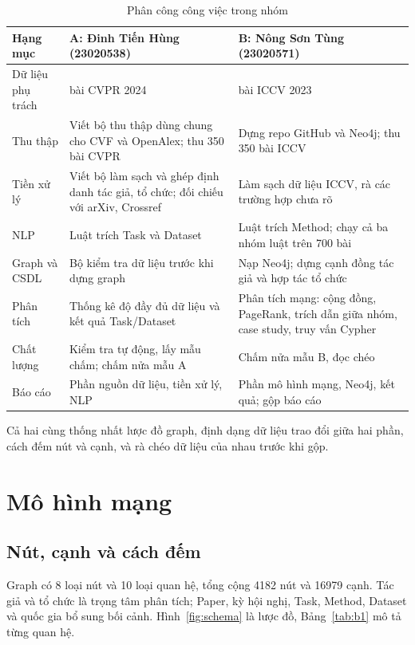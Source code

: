\documentclass[11pt,a4paper]{article}
\begin{document}
\begin{table}[H]
\small\centering
\renewcommand{\arraystretch}{1.25}
\caption{Phân công công việc trong nhóm}
\label{tab:phancong}
\begin{tabularx}{\textwidth}{@{}>{\raggedright\arraybackslash}p{3.2cm} >{\raggedright\arraybackslash}X >{\raggedright\arraybackslash}X@{}}
\toprule
\textbf{Hạng mục} & \textbf{A: Đinh Tiến Hùng (23020538)} & \textbf{B: Nông Sơn Tùng (23020571)}\\
\midrule
Dữ liệu phụ trách & 350 bài CVPR 2024 & 350 bài ICCV 2023\\
Thu thập & Viết bộ thu thập dùng chung cho CVF và OpenAlex; thu 350 bài CVPR & Dựng repo GitHub và Neo4j; thu 350 bài ICCV\\
Tiền xử lý & Viết bộ làm sạch và ghép định danh tác giả, tổ chức; đối chiếu với arXiv, Crossref & Làm sạch dữ liệu ICCV, rà các trường hợp chưa rõ\\
NLP & Luật trích Task và Dataset & Luật trích Method; chạy cả ba nhóm luật trên 700 bài\\
Graph và CSDL & Bộ kiểm tra dữ liệu trước khi dựng graph & Nạp Neo4j; dựng cạnh đồng tác giả và hợp tác tổ chức\\
Phân tích & Thống kê độ đầy đủ dữ liệu và kết quả Task/Dataset & Phân tích mạng: cộng đồng, PageRank, trích dẫn giữa nhóm, case study, truy vấn Cypher\\
Chất lượng & Kiểm tra tự động, lấy mẫu chấm; chấm nửa mẫu A & Chấm nửa mẫu B, đọc chéo\\
Báo cáo & Phần nguồn dữ liệu, tiền xử lý, NLP & Phần mô hình mạng, Neo4j, kết quả; gộp báo cáo\\
\bottomrule
\end{tabularx}
\end{table}

Cả hai cùng thống nhất lược đồ graph, định dạng dữ liệu trao đổi giữa hai phần, cách đếm nút và cạnh, và rà chéo dữ liệu của nhau trước khi gộp.


\section{Mô hình mạng}\label{sec:mohinh}

\subsection{Nút, cạnh và cách đếm}\label{sec:b2.1}

Graph có 8 loại nút và 10 loại quan hệ, tổng cộng 4182 nút và 16979 cạnh. Tác giả và tổ chức là trọng tâm phân tích; Paper, kỳ hội nghị, Task, Method, Dataset và quốc gia bổ sung bối cảnh. Hình~\ref{fig:schema} là lược đồ, Bảng~\ref{tab:b1} mô tả từng quan hệ.
\end{document}
